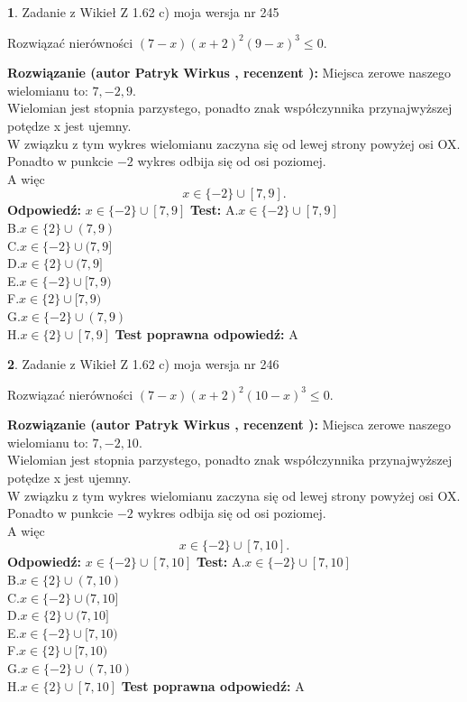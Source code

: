 \documentclass[12pt, a4paper]{article}
\theoremstyle{definition} %
\newtheorem{zad}{}
\newcommand{\zadStart}[1]{\begin{zad}#1\newline}
\newcommand{\zadStop}{\end{zad}}
\newcommand{\rozwStart}[2]{\noindent \textbf{Rozwiązanie (autor #1 , recenzent #2): }\newline}
\newcommand{\rozwStop}{\newline}
\newcommand{\odpStart}{\noindent \textbf{Odpowiedź:}\newline}
\newcommand{\odpStop}{\newline}
\newcommand{\testStart}{\noindent \textbf{Test:}\newline}
\newcommand{\testStop}{\newline}
\newcommand{\kluczStart}{\noindent \textbf{Test poprawna odpowiedź:}\newline}
\newcommand{\kluczStop}{\newline}
\begin{document}
\zadStart{Zadanie z Wikieł Z 1.62 c) moja wersja nr 245}

Rozwiązać nierówności $(7-x)(x+2)^{2}(9-x)^{3}\le0$.
\zadStop
\rozwStart{Patryk Wirkus}{}
Miejsca zerowe naszego wielomianu to: $7, -2, 9$.\\
Wielomian jest stopnia parzystego, ponadto znak współczynnika przy\linebreak najwyższej potędze x jest ujemny.\\ W związku z tym wykres wielomianu zaczyna się od lewej strony powyżej osi OX.\\
Ponadto w punkcie $-2$ wykres odbija się od osi poziomej.\\
A więc $$x \in \{-2\} \cup [7,9].$$
\rozwStop
\odpStart
$x \in \{-2\} \cup [7,9]$
\odpStop
\testStart
A.$x \in \{-2\} \cup [7,9]$\\
B.$x \in \{2\} \cup (7,9)$\\
C.$x \in \{-2\} \cup (7,9]$\\
D.$x \in \{2\} \cup (7,9]$\\
E.$x \in \{-2\} \cup [7,9)$\\
F.$x \in \{2\} \cup [7,9)$\\
G.$x \in \{-2\} \cup (7,9)$\\
H.$x \in \{2\} \cup [7,9]$
\testStop
\kluczStart
A
\kluczStop



\zadStart{Zadanie z Wikieł Z 1.62 c) moja wersja nr 246}

Rozwiązać nierówności $(7-x)(x+2)^{2}(10-x)^{3}\le0$.
\zadStop
\rozwStart{Patryk Wirkus}{}
Miejsca zerowe naszego wielomianu to: $7, -2, 10$.\\
Wielomian jest stopnia parzystego, ponadto znak współczynnika przy\linebreak najwyższej potędze x jest ujemny.\\ W związku z tym wykres wielomianu zaczyna się od lewej strony powyżej osi OX.\\
Ponadto w punkcie $-2$ wykres odbija się od osi poziomej.\\
A więc $$x \in \{-2\} \cup [7,10].$$
\rozwStop
\odpStart
$x \in \{-2\} \cup [7,10]$
\odpStop
\testStart
A.$x \in \{-2\} \cup [7,10]$\\
B.$x \in \{2\} \cup (7,10)$\\
C.$x \in \{-2\} \cup (7,10]$\\
D.$x \in \{2\} \cup (7,10]$\\
E.$x \in \{-2\} \cup [7,10)$\\
F.$x \in \{2\} \cup [7,10)$\\
G.$x \in \{-2\} \cup (7,10)$\\
H.$x \in \{2\} \cup [7,10]$
\testStop
\kluczStart
A
\kluczStop
\end{document}
